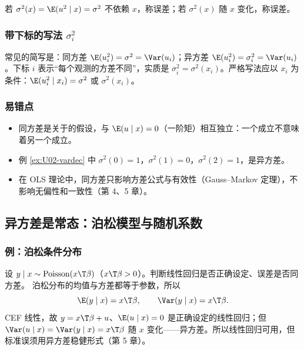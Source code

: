 \begin{defn}[同方差与异方差]\label{def:U02-homo}
若 $\sigma^2(x)=\E(u^2\mid x)=\sigma^2$ 不依赖 $x$，称误差；若 $\sigma^2(x)$ 随 $x$ 变化，称误差。
\end{defn}

\subsubsection{带下标的写法 \texorpdfstring{$\sigma_i^2$}{sigma\_i\^2}}

常见的简写是：同方差 $\E(u_i^2)=\sigma^2=\Var(u_i)$；异方差 $\E(u_i^2)=\sigma_i^2=\Var(u_i)$。下标 $i$ 表示“每个观测的方差不同”，实质是 $\sigma_i^2=\sigma^2(x_i)$。严格写法应以 $x_i$ 为条件：$\E(u_i^2\mid x_i)=\sigma^2$ 或 $\sigma^2(x_i)$。

\subsubsection{易错点}

\begin{note}[同方差的三个易错点]
\begin{itemize}
  \item 同方差是关于的假设，与 $\E(u\mid x)=0$（一阶矩）相互独立：一个成立不意味着另一个成立。
  \item 例 \ref{ex:U02-vardec} 中 $\sigma^2(0)=1$，$\sigma^2(1)=0$，$\sigma^2(2)=1$，是异方差。
  \item 在 OLS 理论中，同方差只影响方差公式与有效性（Gauss--Markov 定理），不影响无偏性和一致性（第 4、5 章）。
\end{itemize}
\end{note}

\subsection{异方差是常态：泊松模型与随机系数}

\subsubsection{例：泊松条件分布}

\begin{exmp}
设 $y\mid x\sim\text{Poisson}(x\T\beta)$（$x\T\beta>0$）。判断线性回归是否正确设定、误差是否同方差。
\solution
泊松分布的均值与方差都等于参数，所以
\[
\E(y\mid x)=x\T\beta,\qquad \Var(y\mid x)=x\T\beta.
\]
CEF 线性，故 $y=x\T\beta+u$、$\E(u\mid x)=0$ 是正确设定的线性回归；但 $\Var(u\mid x)=\Var(y\mid x)=x\T\beta$ 随 $x$ 变化——异方差。所以线性回归可用，但标准误须用异方差稳健形式（第 5 章）。
\end{exmp}

